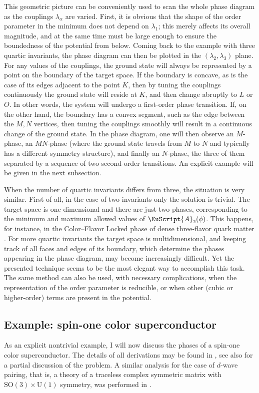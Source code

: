 \documentclass[final,3p,times,12pt,a4paper,sort&compress]{elsarticle}
\newcommand\gr[1]{\mathrm{#1}}              %
\newcommand\AP{\EuScript{A}}                %
\begin{document}
This geometric picture can be conveniently used to scan the whole phase diagram
as the couplings $\lambda_\alpha$ are varied. First, it is obvious that the
shape of the order parameter in the minimum does not depend on $\lambda_1$;
this merely affects its overall magnitude, and at the same time must be large
enough to ensure the boundedness of the potential from below. Coming back to
the example with three quartic invariants, the phase diagram can then be
plotted in the $(\lambda_2,\lambda_3)$ plane. For any values of the couplings,
the ground state will always be represented by a point on the boundary of the
target space. If the boundary is concave, as is the case of its edges adjacent
to the point $K$, then by tuning the couplings continuously the ground state
will reside at $K$, and then change abruptly to $L$ or $O$. In other words, the
system will undergo a first-order phase transition. If, on the other hand, the
boundary has a convex segment, such as the edge between the $M,N$ vertices,
then tuning the couplings smoothly will result in a continuous change of the
ground state. In the phase diagram, one will then observe an $M$-phase, an
$MN$-phase (where the ground state travels from $M$ to $N$ and typically has a
different symmetry structure), and finally an $N$-phase, the three of them
separated by a sequence of two second-order transitions. An explicit example
will be given in the next subsection.

When the number of quartic invariants differs from three, the situation is very
similar. First of all, in the case of two invariants only the solution is
trivial. The target space is one-dimensional and there are just two phases,
corresponding to the minimum and maximum allowed values of $\AP_2(\phi)$. This
happens, for instance, in the Color--Flavor Locked phase of dense three-flavor
quark matter \cite{Iida:2000ha}. For more quartic invariants the target space
is multidimensional, and keeping track of all faces and edges of its boundary,
which determine the phases appearing in the phase diagram, may become
increasingly difficult. Yet the presented technique seems to be the most
elegant way to accomplish this task. The same method can also be used, with
necessary complications, when the representation of the order parameter is
reducible, or when other (cubic or higher-order) terms are present in the
potential.


\subsection{Example: spin-one color superconductor}
\label{subsec:spin1CSC}
As an explicit nontrivial example, I will now discuss the phases of a spin-one
color superconductor. The details of all derivations may be found in
\cite{Brauner:2008ma}, see also \cite{Bailin:1983bm,Schmitt:2004et}
for a partial discussion of the problem. A similar analysis for the case of
$d$-wave pairing, that is, a theory of a traceless complex symmetric matrix with
$\gr{SO(3)\times U(1)}$ symmetry, was performed in \cite{Mermin:1974me}.
\end{document}
